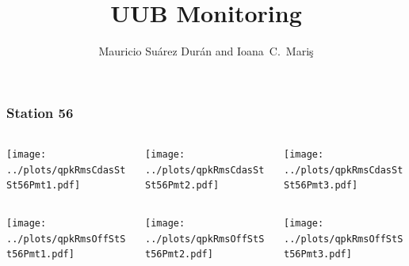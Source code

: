 \documentclass[aspectratio=169]{beamer}
\title{UUB Monitoring}
\author{
  Mauricio Su\'arez Dur\'an and Ioana~C.~Mari\c{s}
}
\institute{IIHE-ULB}
\begin{document}
\begin{frame}
  \titlepage
\end{frame}
\begin{frame} 
  \frametitle{Station 56}
  \begin{center}
    \begin{columns}
      \begin{column}{0.33\textwidth}
        \texttt{[image: ../plots/qpkRmsCdasStSt56Pmt1.pdf]}
      \end{column}
      \begin{column}{0.33\textwidth}
        \texttt{[image: ../plots/qpkRmsCdasStSt56Pmt2.pdf]}
      \end{column}
      \begin{column}{0.33\textwidth}
        \texttt{[image: ../plots/qpkRmsCdasStSt56Pmt3.pdf]}
      \end{column}
    \end{columns}
  \end{center}

  \begin{center}
    \begin{columns}
      \begin{column}{0.33\textwidth}
        \texttt{[image: ../plots/qpkRmsOffStSt56Pmt1.pdf]}
      \end{column}
      \begin{column}{0.33\textwidth}
        \texttt{[image: ../plots/qpkRmsOffStSt56Pmt2.pdf]}
      \end{column}
      \begin{column}{0.33\textwidth}
        \texttt{[image: ../plots/qpkRmsOffStSt56Pmt3.pdf]}
      \end{column}
    \end{columns}
  \end{center}
\end{frame}
\end{document}

